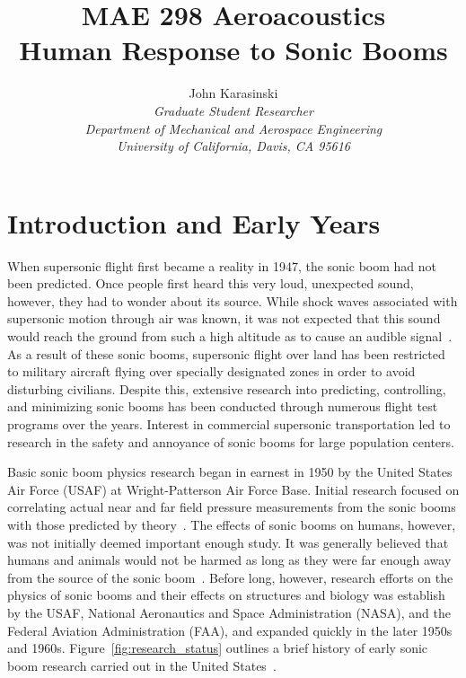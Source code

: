 \documentclass[]{aiaa-tc}%
\title{MAE 298 Aeroacoustics \\ Human Response to Sonic Booms}
\author{ John Karasinski \\
  {\normalsize\itshape Graduate Student Researcher} \\
  {\normalsize\itshape Department of Mechanical and Aerospace Engineering} \\
  {\normalsize\itshape University of California, Davis, CA 95616}
}
\begin{document}
\maketitle


\section{Introduction and Early Years}
When supersonic flight first became a reality in 1947, the sonic boom had not been predicted. Once people first heard this very loud, unexpected sound, however, they had to wonder about its source. While shock waves associated with supersonic motion through air was known, it was not expected that this sound would reach the ground from such a high altitude as to cause an audible signal~\cite{von1966effects}. As a result of these sonic booms, supersonic flight over land has been restricted to military aircraft flying over specially designated zones in order to avoid disturbing civilians. Despite this, extensive research into predicting, controlling, and minimizing sonic booms has been conducted through numerous flight test programs over the years. Interest in commercial supersonic transportation led to research in the safety and annoyance of sonic booms for large population centers.

Basic sonic boom physics research began in earnest in 1950 by the United States Air Force (USAF) at Wright-Patterson Air Force Base. Initial research focused on correlating actual near and far field pressure measurements from the sonic booms with those predicted by theory~\cite{von1957aircraft}. The effects of sonic booms on humans, however, was not initially deemed important enough study. It was generally believed that humans and animals would not be harmed as long as they were far enough away from the source of the sonic boom~\cite{von1966effects}. Before long, however, research efforts on the physics of sonic booms and their effects on structures and biology was establish by the USAF, National Aeronautics and Space Administration (NASA), and the Federal Aviation Administration (FAA), and expanded quickly in the later 1950s and 1960s. Figure~\ref{fig:research_status} outlines a brief history of early sonic boom research carried out in the United States~\cite{nixon1965sonic}.
\end{document}
